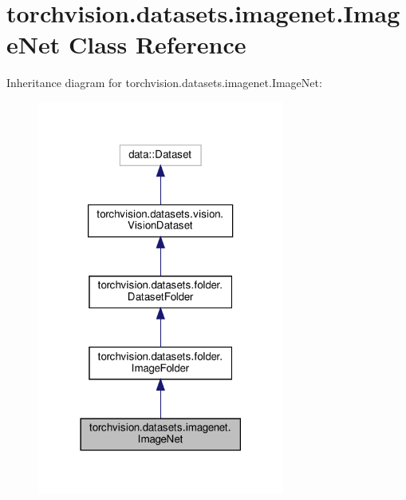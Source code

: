 \hypertarget{classtorchvision_1_1datasets_1_1imagenet_1_1ImageNet}{}\section{torchvision.\+datasets.\+imagenet.\+Image\+Net Class Reference}
\label{classtorchvision_1_1datasets_1_1imagenet_1_1ImageNet}


Inheritance diagram for torchvision.\+datasets.\+imagenet.\+Image\+Net\+:
\nopagebreak
\begin{figure}[H]
\begin{center}
\leavevmode
\includegraphics[width=230pt]{classtorchvision_1_1datasets_1_1imagenet_1_1ImageNet__inherit__graph}
\end{center}
\end{figure}


